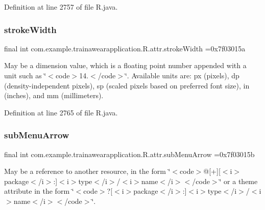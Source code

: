 Definition at line 2757 of file R.\+java.

\mbox{\label{classcom_1_1example_1_1trainawearapplication_1_1_r_1_1attr_a98158d450e24db795fd993f7c358336a}} 
\subsubsection{\texorpdfstring{strokeWidth}{strokeWidth}}
{\footnotesize\ttfamily final int com.\+example.\+trainawearapplication.\+R.\+attr.\+stroke\+Width =0x7f03015a\hspace{0.3cm}{\ttfamily [static]}}

May be a dimension value, which is a floating point number appended with a unit such as \char`\"{}$<$code$>$14.\+5sp$<$/code$>$\char`\"{}. Available units are\+: px (pixels), dp (density-\/independent pixels), sp (scaled pixels based on preferred font size), in (inches), and mm (millimeters). 

Definition at line 2765 of file R.\+java.

\mbox{\label{classcom_1_1example_1_1trainawearapplication_1_1_r_1_1attr_a3fb7a4acfae4963d8dbcdc217db72525}} 
\subsubsection{\texorpdfstring{subMenuArrow}{subMenuArrow}}
{\footnotesize\ttfamily final int com.\+example.\+trainawearapplication.\+R.\+attr.\+sub\+Menu\+Arrow =0x7f03015b\hspace{0.3cm}{\ttfamily [static]}}

May be a reference to another resource, in the form \char`\"{}$<$code$>$@\mbox{[}+\mbox{]}\mbox{[}$<$i$>$package$<$/i$>$\+:\mbox{]}$<$i$>$type$<$/i$>$/$<$i$>$name$<$/i$>$$<$/code$>$\char`\"{} or a theme attribute in the form \char`\"{}$<$code$>$?\mbox{[}$<$i$>$package$<$/i$>$\+:\mbox{]}$<$i$>$type$<$/i$>$/$<$i$>$name$<$/i$>$$<$/code$>$\char`\"{}. 

